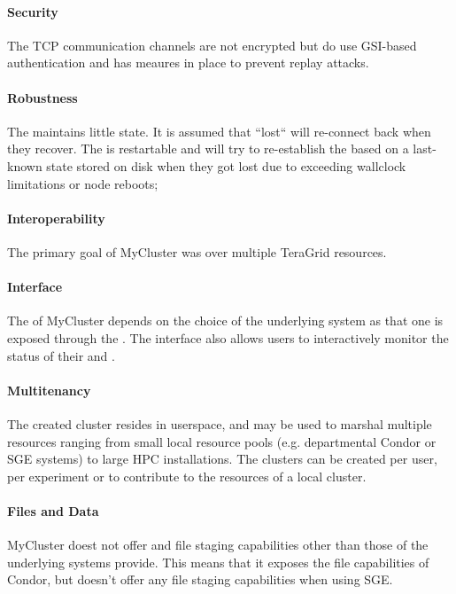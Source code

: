 \documentclass{sig-alternate}
\begin{document}
\paragraph{Security}
The TCP communication channels are not encrypted but do use GSI-based
authentication and has meaures in place to prevent replay attacks.

\paragraph{Robustness}
The  maintains little state. It is assumed that ``lost``
 will re-connect back when they recover.
The  is restartable and will try to re-establish the
 based on a last-known state stored on disk when they got
lost due to exceeding wallclock limitations or node reboots;

\paragraph{Interoperability}
The primary goal of MyCluster was  over multiple TeraGrid
resources.

\paragraph{Interface}
The  of MyCluster depends on the choice of the underlying
system as that one is exposed through the .
The interface also allows users to interactively monitor the status of their
\vocab{\pilots} and .

\paragraph{Multitenancy}
The created cluster resides in userspace, and may be used to marshal multiple
resources ranging from small local resource pools (e.g.  departmental Condor or
SGE systems) to large HPC installations.
The clusters can be created per user, per experiment or to contribute to
the resources of a local cluster.

\paragraph{Files and Data}
MyCluster doest not offer and file staging capabilities other than those of the
underlying systems provide. This means that it exposes the file capabilities of
Condor, but doesn't offer any file staging capabilities when using SGE.
\end{document}
